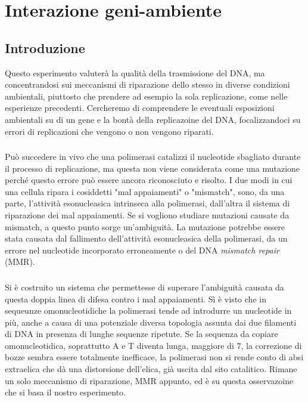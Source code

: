 \section*{Interazione geni-ambiente}
 \subsection{Introduzione}
 Questo esperimento valuterà la qualità della trasmissione del DNA, ma concentrandosi sui meccanismi di riparazione dello stesso in diverse condizioni ambientali, piuttosto che prendere ad esempio la sola replicazione, come nelle esperienze precedenti. Cercheremo di comprendere le eventuali esposizioni ambientali su di un gene e la bontà della replicazoine del DNA, focalizzandoci su errori di replicazioni che vengono o non vengono riparati. 
 
 \subsubsection{}
 Può succedere in vivo che una polimerasi catalizzi il nucleotide sbagliato durante il processo di replicazione, ma questa non viene considerata come una mutazione perché questo errore può essere ancora riconosciuto e risolto. I due modi in cui una cellula ripara i cosiddetti "mal appaiamenti" o "mismatch", sono, da una parte, l'attività esonucleasica intrinseca alla polimerasi, dall'altra il sistema di riparazione dei mal appaiamenti. Se si vogliono studiare mutazioni causate da mismatch, a questo punto sorge un'ambiguità. La mutazione potrebbe essere stata causata dal fallimento dell'attività esonucleasica della polimerasi, da un errore nel nucleotide incorporato erroneamente o del DNA \textit{mismatch repair} (MMR). 
 
 \subsubsection{}
 Si è costruito un sistema che permettesse di superare l'ambiguità causata da questa doppia linea di difesa contro i mal appaiamenti. Sì è visto che in sequeunze omonucleotidiche la polimerasi tende ad introdurre un nucleotide in più, anche a causa di una potenziale diversa topologia assunta dai due filamenti di DNA in presenza di lunghe sequenze ripetute. Se la sequenza da copiare omonucleotidica, soprattutto A e T diventa lunga, maggiore di 7, la correzione di bozze sembra essere totalmente inefficace, la polimerasi non si rende conto di absi extraelica che dà una distorsione dell'elica, già uscita dal sito catalitico. Rimane un solo meccanismo di riparazione, MMR appunto, ed è su questa osservazoine che si basa il nostro esperimento. 
 
